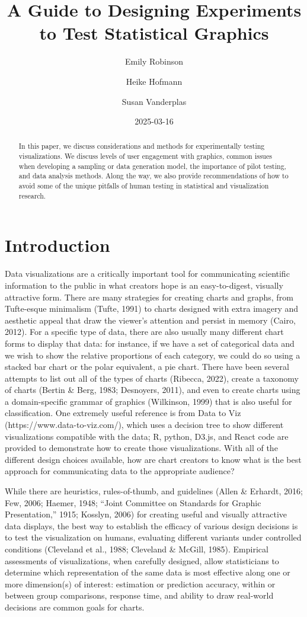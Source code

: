 \documentclass[
  10pt,
  letterpaper,
  DIV=11,
  numbers=noendperiod]{scrartcl}
\title{A Guide to Designing Experiments to Test Statistical Graphics}
\author{Emily Robinson \and Heike Hofmann \and Susan Vanderplas}
\date{2025-03-16}
\begin{document}
\maketitle
\begin{abstract}
In this paper, we discuss considerations and methods for experimentally
testing visualizations. We discuss levels of user engagement with
graphics, common issues when developing a sampling or data generation
model, the importance of pilot testing, and data analysis methods. Along
the way, we also provide recommendations of how to avoid some of the
unique pitfalls of human testing in statistical and visualization
research.
\end{abstract}


\section{Introduction}\label{introduction}

Data visualizations are a critically important tool for communicating
scientific information to the public in what creators hope is an
easy-to-digest, visually attractive form. There are many strategies for
creating charts and graphs, from Tufte-esque minimalism (Tufte, 1991) to
charts designed with extra imagery and aesthetic appeal that draw the
viewer's attention and persist in memory (Cairo, 2012). For a specific
type of data, there are also usually many different chart forms to
display that data: for instance, if we have a set of categorical data
and we wish to show the relative proportions of each category, we could
do so using a stacked bar chart or the polar equivalent, a pie chart.
There have been several attempts to list out all of the types of charts
(Ribecca, 2022), create a taxonomy of charts (Bertin \& Berg, 1983;
Desnoyers, 2011), and even to create charts using a domain-specific
grammar of graphics (Wilkinson, 1999) that is also useful for
classification. One extremely useful reference is from Data to Viz
(https://www.data-to-viz.com/), which uses a decision tree to show
different visualizations compatible with the data; R, python, D3.js, and
React code are provided to demonstrate how to create those
visualizations. With all of the different design choices available, how
are chart creators to know what is the best approach for communicating
data to the appropriate audience?

While there are heuristics, rules-of-thumb, and guidelines (Allen \&
Erhardt, 2016; Few, 2006; Haemer, 1948; {``Joint Committee on Standards
for Graphic Presentation,''} 1915; Kosslyn, 2006) for creating useful
and visually attractive data displays, the best way to establish the
efficacy of various design decisions is to test the visualization on
humans, evaluating different variants under controlled conditions
(Cleveland et al., 1988; Cleveland \& McGill, 1985). Empirical
assessments of visualizations, when carefully designed, allow
statisticians to determine which representation of the same data is most
effective along one or more dimension(s) of interest: estimation or
prediction accuracy, within or between group comparisons, response time,
and ability to draw real-world decisions are common goals for charts.
\end{document}
